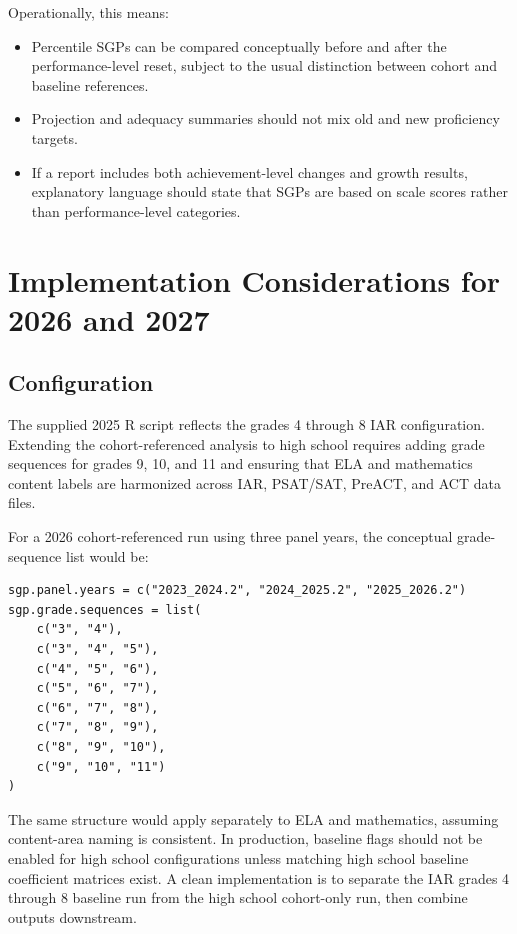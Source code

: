 \documentclass[11pt]{article}
\begin{document}
Operationally, this means:

\begin{itemize}
\item Percentile SGPs can be compared conceptually before and after the performance-level reset, subject to the usual distinction between cohort and baseline references.
\item Projection and adequacy summaries should not mix old and new proficiency targets.
\item If a report includes both achievement-level changes and growth results, explanatory language should state that SGPs are based on scale scores rather than performance-level categories.
\end{itemize}

\section{Implementation Considerations for 2026 and 2027}

\subsection{Configuration}

The supplied 2025 R script reflects the grades 4 through 8 IAR configuration. Extending the cohort-referenced analysis to high school requires adding grade sequences for grades 9, 10, and 11 and ensuring that ELA and mathematics content labels are harmonized across IAR, PSAT/SAT, PreACT, and ACT data files.

For a 2026 cohort-referenced run using three panel years, the conceptual grade-sequence list would be:

\begin{verbatim}
sgp.panel.years = c("2023_2024.2", "2024_2025.2", "2025_2026.2")
sgp.grade.sequences = list(
    c("3", "4"),
    c("3", "4", "5"),
    c("4", "5", "6"),
    c("5", "6", "7"),
    c("6", "7", "8"),
    c("7", "8", "9"),
    c("8", "9", "10"),
    c("9", "10", "11")
)
\end{verbatim}

The same structure would apply separately to ELA and mathematics, assuming content-area naming is consistent. In production, baseline flags should not be enabled for high school configurations unless matching high school baseline coefficient matrices exist. A clean implementation is to separate the IAR grades 4 through 8 baseline run from the high school cohort-only run, then combine outputs downstream.
\end{document}

